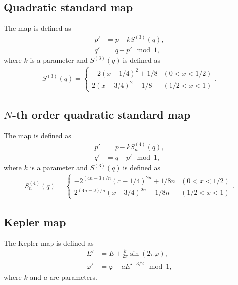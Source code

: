 \documentclass{article}
\begin{document}
\subsection*{Quadratic standard map}
The map is defined as
\begin{align*}
p'&=p-k S^{(3)}(q),\\
q'&=q+p'\mod 1,
\end{align*}
where $k$ is a parameter and $S^{(3)}(q)$ is defined as
\begin{align*}
S^{(3)}(q)=
\begin{cases}
-2(x-1/4)^2+1/8&(0<x<1/2)\\
 2(x-3/4)^2-1/8&(1/2<x<1)
\end{cases}
.
\end{align*}

\subsection*{$N$-th order quadratic standard map}
The map is defined as
\begin{align*}
p'&=p-k S^{(4)}_{n}(q),\\
q'&=q+p'\mod 1,
\end{align*}
where $k$ is a parameter and $S^{(3)}(q)$ is defined as
\begin{align*}
S^{(4)}_{n}(q)=
\begin{cases}
-2^{(4n-3)/n} (x-1/4)^{2n}+1/8n&(0<x<1/2)\\
2^{(4n-3)/n} (x-3/4)^{2n}-1/8n&(1/2<x<1)
\end{cases}
.
\end{align*}


\subsection*{Kepler map}
The Kepler map is defined as
\begin{align*}
E'&=E+\frac{k}{2\pi}\sin(2\pi \varphi),\\
\varphi'&=\varphi-aE'^{-3/2}\mod 1,
\end{align*}
where $k$ and $a$ are parameters.
\end{document}
